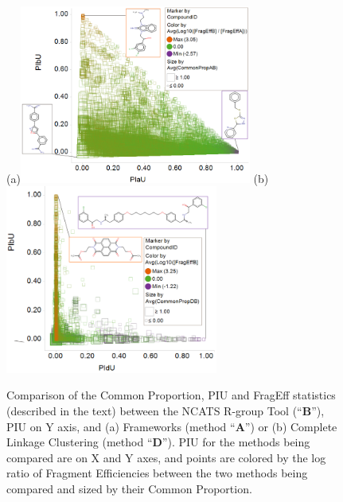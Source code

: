 \documentclass[journal=jacsat,biochem,manuscript=article]{achemso}
\begin{document}
\begin{figure}
(a)\includegraphics[width=3in]{fig/statcompare_frames_RGtool_transparent_density_v2.png}
(b)\includegraphics[width=2.75in]{fig/statcompare_CLink_RGtool_transparent_density.png}
  \caption{Comparison of the Common Proportion, PIU and FragEff statistics (described in the text) between the NCATS R-group Tool (``{\bf B}''),
    PIU on Y axis,
    and (a) Frameworks (method ``{\bf A}'')
    or (b) Complete Linkage Clustering (method ``{\bf D}'').
    PIU for the methods being compared are on X and Y axes, and points are 
    colored by the log ratio of Fragment Efficiencies between the two methods being compared and sized by their Common Proportion.}
\label{fig:statcompare}
\end{figure}
\end{document}
